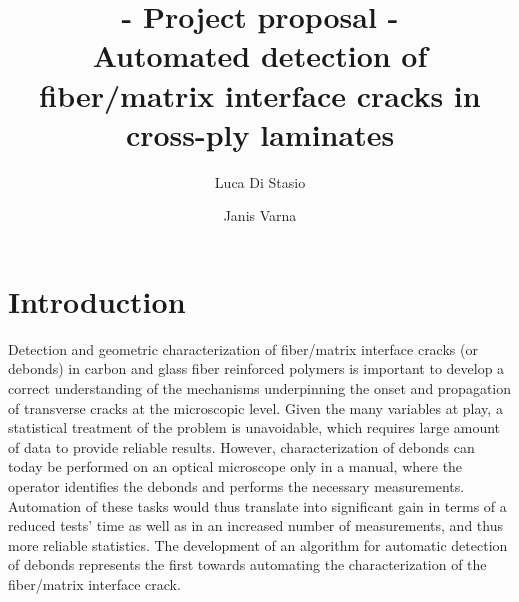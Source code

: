 \documentclass[review]{elsarticle}
\begin{document}
\begin{frontmatter}

\title{{\bf - Project proposal -}\\Automated detection of fiber/matrix interface cracks in cross-ply laminates}


\author{Luca Di Stasio}
\author{Janis Varna}






\end{frontmatter}

\linenumbers

\section{Introduction}

Detection and geometric characterization of fiber/matrix interface cracks (or debonds) in carbon and glass fiber reinforced polymers is important to develop a correct understanding of the mechanisms underpinning the onset and propagation of transverse cracks at the microscopic level. Given the many variables at play, a statistical treatment of the problem is unavoidable, which requires large amount of data to provide reliable results. However, characterization of debonds can today be performed on an optical microscope only in a manual, where the operator identifies the debonds and performs the necessary measurements. Automation of these tasks would thus translate into significant gain in terms of a reduced tests' time as well as in an increased number of measurements, and thus more reliable statistics. The development of an algorithm for automatic detection of debonds represents the first towards automating the characterization of the fiber/matrix interface crack.
\end{document}
